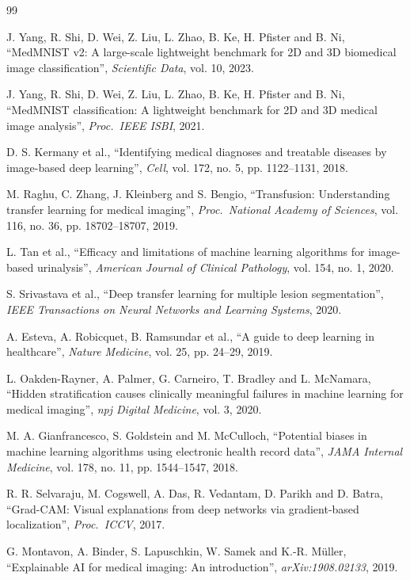 \documentclass[11pt,a4paper]{article}
\begin{document}
\begin{thebibliography}{99}
\small

J. Yang, R. Shi, D. Wei, Z. Liu, L. Zhao, B. Ke, H. Pfister and B. Ni, ``MedMNIST v2: A large-scale lightweight benchmark for 2D and 3D biomedical image classification'', \emph{Scientific Data}, vol. 10, 2023.

J. Yang, R. Shi, D. Wei, Z. Liu, L. Zhao, B. Ke, H. Pfister and B. Ni, ``MedMNIST classification: A lightweight benchmark for 2D and 3D medical image analysis'', \emph{Proc.\ IEEE ISBI}, 2021.

D. S. Kermany et al., ``Identifying medical diagnoses and treatable diseases by image-based deep learning'', \emph{Cell}, vol. 172, no. 5, pp. 1122--1131, 2018.

M. Raghu, C. Zhang, J. Kleinberg and S. Bengio, ``Transfusion: Understanding transfer learning for medical imaging'', \emph{Proc.\ National Academy of Sciences}, vol. 116, no. 36, pp. 18702--18707, 2019.

L. Tan et al., ``Efficacy and limitations of machine learning algorithms for image-based urinalysis'', \emph{American Journal of Clinical Pathology}, vol. 154, no. 1, 2020.

S. Srivastava et al., ``Deep transfer learning for multiple lesion segmentation'', \emph{IEEE Transactions on Neural Networks and Learning Systems}, 2020.

A. Esteva, A. Robicquet, B. Ramsundar et al., ``A guide to deep learning in healthcare'', \emph{Nature Medicine}, vol. 25, pp. 24--29, 2019.

L. Oakden-Rayner, A. Palmer, G. Carneiro, T. Bradley and L. McNamara, ``Hidden stratification causes clinically meaningful failures in machine learning for medical imaging'', \emph{npj Digital Medicine}, vol. 3, 2020.

M. A. Gianfrancesco, S. Goldstein and M. McCulloch, ``Potential biases in machine learning algorithms using electronic health record data'', \emph{JAMA Internal Medicine}, vol. 178, no. 11, pp. 1544--1547, 2018.

R. R. Selvaraju, M. Cogswell, A. Das, R. Vedantam, D. Parikh and D. Batra, ``Grad-CAM: Visual explanations from deep networks via gradient-based localization'', \emph{Proc.\ ICCV}, 2017.

G. Montavon, A. Binder, S. Lapuschkin, W. Samek and K.-R. M\"uller, ``Explainable AI for medical imaging: An introduction'', \emph{arXiv:1908.02133}, 2019.


\end{thebibliography}
\end{document}
